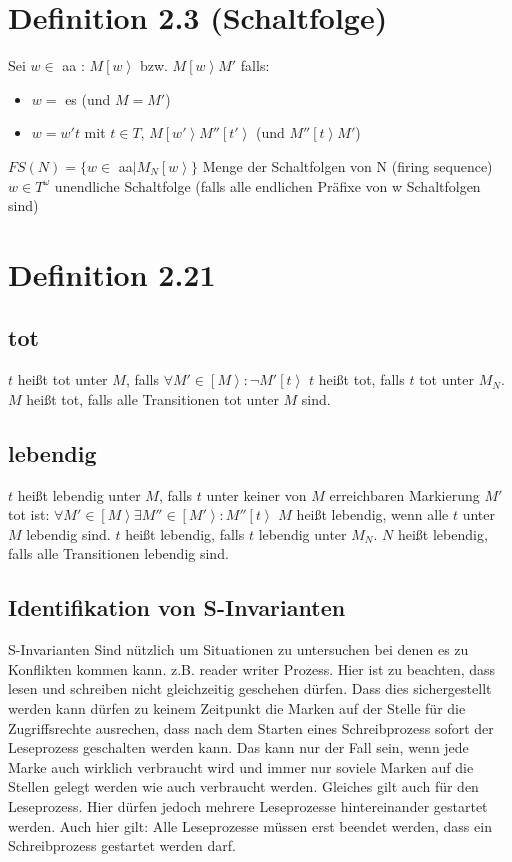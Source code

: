 \documentclass[12pt]{scrreprt}
\begin{document}
\section{Definition 2.3 (Schaltfolge)}
Sei $w \in$ \ac{aa} : $M\left[w\right>$ bzw. $M\left[w\right>M'$ falls:
\begin{itemize}
	\item $w =$ \ac{es} (und $M=M'$)
	\item $w = w't$ mit $t \in T$, $M\left[w'\right>M''\left[t'\right>$ (und $M''\left[t\right>M'$)
\end{itemize}
$FS(N)=\{w \in$ \ac{aa}$ \mid M_N \left[w\right>\}$ Menge der Schaltfolgen von N (firing sequence)\newline
$w \in T^\omega$ unendliche Schaltfolge (falls alle endlichen Präfixe von w Schaltfolgen sind)

\section{Definition 2.21}
\subsection{tot}
$t$ heißt tot unter $M$, falls $\forall M' \in \left[M\right> : \neg M'\left[t\right>$\newline
$t$ heißt tot, falls $t$ tot unter $M_N$.\newline
$M$ heißt tot, falls alle Transitionen tot unter $M$ sind.
\newpage
\subsection{lebendig}
$t$ heißt lebendig unter $M$, falls $t$ unter keiner von $M$ erreichbaren Markierung $M'$ tot ist:\newline
$\forall M' \in \left[M\right>\exists M'' \in \left[M'\right> :  M'' \left[t\right>$\newline
$M$ heißt lebendig, wenn alle $t$ unter $M$ lebendig sind.\newline
$t$ heißt lebendig, falls $t$ lebendig unter $M_N$.\newline
$N$ heißt lebendig, falls alle Transitionen lebendig sind.

\subsection{Identifikation von S-Invarianten}
S-Invarianten Sind nützlich um Situationen zu untersuchen bei denen es zu Konflikten kommen kann. z.B. reader writer Prozess. Hier ist zu beachten, dass lesen und schreiben nicht gleichzeitig geschehen dürfen. Dass dies sichergestellt werden kann dürfen zu keinem Zeitpunkt die Marken auf der Stelle für die Zugriffsrechte ausrechen, dass nach dem Starten eines Schreibprozess sofort der Leseprozess geschalten werden kann. Das kann nur der Fall sein, wenn jede Marke auch wirklich verbraucht wird und immer nur soviele Marken auf die Stellen gelegt werden wie auch verbraucht werden. Gleiches gilt auch für den Leseprozess. Hier dürfen jedoch mehrere Leseprozesse hintereinander gestartet werden. Auch hier gilt: Alle Leseprozesse müssen erst beendet werden, dass ein Schreibprozess gestartet werden darf.
\end{document}
